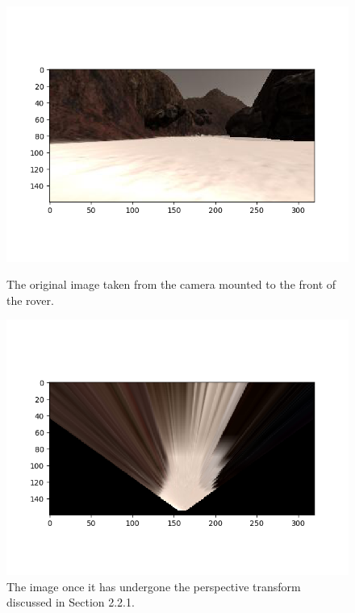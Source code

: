 \documentclass[a4paper]{article}
\begin{document}
\begin{figure}[h]
	\centering
	\begin{minipage}[t]{0.45\linewidth}
	\centering
	\includegraphics[scale=0.45]{image8}
	\vspace{-1.5cm}
	\caption{The original image taken from the camera mounted to the front of the rover.}
	\end{minipage}
	\hspace{0.5cm}
	\begin{minipage}[t]{0.45\linewidth}
	\centering
	\includegraphics[scale=0.45]{image9}
	\vspace{-1.5cm}
	\caption{The image once it has undergone the perspective transform discussed in Section 2.2.1.}
	\end{minipage}
\end{figure}
\end{document}
